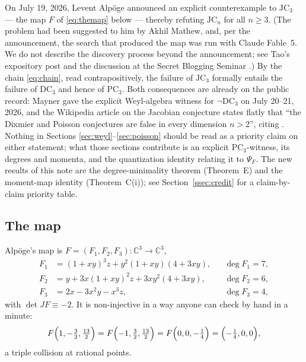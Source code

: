 \documentclass[11pt]{amsart}
\newcommand{\CC}{\mathbb{C}}
\newcommand{\JC}{\mathrm{JC}}
\newcommand{\DC}{\mathrm{DC}}
\newcommand{\PC}{\mathrm{PC}}
\theoremstyle{plain}
\theoremstyle{definition}
\theoremstyle{remark}
\begin{document}
On July 19, 2026, Levent Alp\"oge announced an explicit counterexample to
$\JC_{3}$ \cite{Alpoge26} --- the map $F$ of \eqref{eq:themap} below ---
thereby refuting $\JC_{n}$ for all $n\ge3$. (The problem had been suggested to him by Akhil
Mathew, and, per the announcement, the search that produced the map was run
with Claude Fable~5. We do not describe the discovery process beyond the
announcement; see Tao's expository post \cite{Tao26} and the discussion at
the Secret Blogging Seminar \cite{Speyer26}.) By the chain
\eqref{eq:chain}, read contrapositively, the failure of $\JC_{3}$ formally
entails the failure of $\DC_{3}$ and hence of $\PC_{3}$. Both consequences
are already on the public record: Mayner \cite{Mayner26} gave the explicit
Weyl-algebra witness for $\neg\DC_{3}$ on July 20--21, 2026, and the
Wikipedia article on the Jacobian conjecture states flatly that ``the
Dixmier and Poisson conjectures are false in every dimension $n>2$'',
citing \cite{AvdE07}. Nothing in Sections
\ref{sec:weyl}--\ref{sec:poisson} should be read as a priority claim on
either statement; what those sections contribute is an explicit
$\PC_{3}$-witness, its degrees and momenta, and the quantization identity
relating it to $\Psi_{F}$. The new results of this note are the
degree-minimality theorem (Theorem~E) and the moment-map identity
(Theorem~C(i)); see Section~\ref{ssec:credit} for a claim-by-claim
priority table.

\subsection{The map}
Alp\"oge's map is $F=(F_{1},F_{2},F_{3})\colon\CC^{3}\to\CC^{3}$,
\begin{equation}\label{eq:themap}
\begin{aligned}
F_{1}&=(1+xy)^{3}z+y^{2}(1+xy)(4+3xy), &&\deg F_{1}=7,\\
F_{2}&=y+3x(1+xy)^{2}z+3xy^{2}(4+3xy), &&\deg F_{2}=6,\\
F_{3}&=2x-3x^{2}y-x^{3}z, &&\deg F_{3}=4,
\end{aligned}
\end{equation}
with $\det JF\equiv-2$. It is non-injective in a way anyone can check by
hand in a minute:
\begin{equation}\label{eq:collision}
F\Bigl(1,-\tfrac32,\tfrac{13}2\Bigr)
=F\Bigl(-1,\tfrac32,\tfrac{13}2\Bigr)
=F\Bigl(0,0,-\tfrac14\Bigr)
=\Bigl(-\tfrac14,0,0\Bigr),
\end{equation}
a triple collision at rational points.
\end{document}
